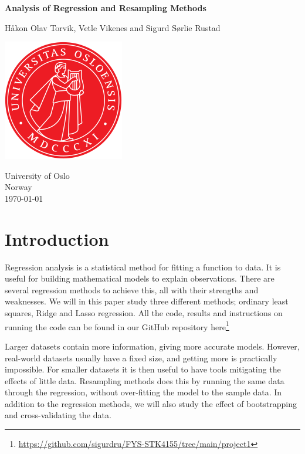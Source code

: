\documentclass[reprint,english,notitlepage,aps,nobalancelastpage,nofootinbib]{revtex4-1}  %
\begin{document}
\begin{titlepage}
	\begin{center}
	\textbf{Analysis of Regression and Resampling Methods}

	\vspace{0.2cm}
	Håkon Olav Torvik, Vetle Vikenes and Sigurd Sørlie Rustad

	\vspace{0.5cm}
	\includegraphics[scale=0.5]{../../pictures/UIO}
	\vspace{0.8cm}

	University of Oslo\\
	Norway\\
	\today	\\
	\end{center}
	\tableofcontents
	\clearpage
\end{titlepage}

\onecolumngrid
\section{Introduction}

Regression analysis is a statistical method for fitting a function to data. It is useful for building mathematical models to explain observations. There are several regression methods to achieve this, all with their strengths and weaknesses. We will in this paper study three different methods; ordinary least squares, Ridge and Lasso regression. All the code, results and instructions on running the code can be found in our GitHub repository here\footnote{\href{https://github.com/sigurdru/FYS-STK4155/tree/main/project1}{https://github.com/sigurdru/FYS-STK4155/tree/main/project1}}

Larger datasets contain more information, giving more accurate models. However, real-world datasets usually have a fixed size, and getting more is practically impossible. For smaller datasets it is then useful to have tools mitigating the effects of little data. Resampling methods does this by running the same data through the regression, without over-fitting the model to the sample data. In addition to the regression methods, we will also study the effect of bootstrapping and cross-validating the data.
\end{document}
